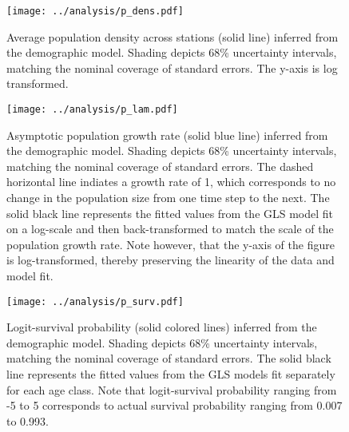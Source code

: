 \documentclass[11pt]{article}
\begin{document}
\clearpage
\begin{figure}
\centering
\texttt{[image: ../analysis/p\_dens.pdf]}
\caption{\label{fig:p_dens}
Average population density across stations (solid line) 
inferred from the demographic model.
Shading depicts 68\% uncertainty intervals, 
matching the nominal coverage of standard errors.
The y-axis is log transformed.
}
\end{figure}
\clearpage

\clearpage
\begin{figure}
\centering
\texttt{[image: ../analysis/p\_lam.pdf]}
\caption{\label{fig:p_lam}
Asymptotic population growth rate (solid blue line) inferred from the demographic model.
Shading depicts 68\% uncertainty intervals, 
matching the nominal coverage of standard errors.
The dashed horizontal line indiates a growth rate of 1,
which corresponds to no change in the population size from one time step to the next.
The solid black line represents the fitted values from the GLS model
fit on a log-scale and then back-transformed 
to match the scale of the population growth rate.
Note however, that the y-axis of the figure is log-transformed, 
thereby preserving the linearity of the data and model fit.
}
\end{figure}
\clearpage

\clearpage
\begin{figure}
\centering
\texttt{[image: ../analysis/p\_surv.pdf]}
\caption{\label{fig:p_surv}
Logit-survival probability (solid colored lines) inferred from the demographic model.
Shading depicts 68\% uncertainty intervals, 
matching the nominal coverage of standard errors.
The solid black line represents the fitted values from the GLS models
fit separately for each age class.
Note that logit-survival probability ranging from -5 to 5 
corresponds to actual survival probability ranging from 0.007 to 0.993.
}
\end{figure}
\clearpage
\end{document}
